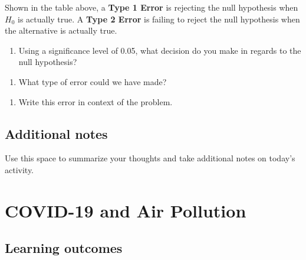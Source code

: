 \documentclass[
]{report}
\providecommand{\tightlist}{%
  \setlength{\itemsep}{0pt}\setlength{\parskip}{0pt}}
\begin{document}
Shown in the table above, a \textbf{Type 1 Error} is rejecting the null hypothesis when \(H_0\) is actually true. A \textbf{Type 2 Error} is failing to reject the null hypothesis when the alternative is actually true.

\begin{enumerate}
\def\labelenumi{\arabic{enumi}.}
\setcounter{enumi}{24}
\tightlist
\item
  Using a significance level of 0.05, what decision do you make in regards to the null hypothesis?
\end{enumerate}

\vspace{0.5in}

\begin{enumerate}
\def\labelenumi{\arabic{enumi}.}
\setcounter{enumi}{266}
\tightlist
\item
  What type of error could we have made?
\end{enumerate}

\vspace{0.5in}

\begin{enumerate}
\def\labelenumi{\arabic{enumi}.}
\setcounter{enumi}{26}
\tightlist
\item
  Write this error in context of the problem.
\end{enumerate}

\vspace{1in}

\newpage

\hypertarget{additional-notes}{%
\section{Additional notes}\label{additional-notes}}

Use this space to summarize your thoughts and take additional notes on today's activity.

\hypertarget{covid-19-and-air-pollution}{%
\chapter{COVID-19 and Air Pollution}\label{covid-19-and-air-pollution}}

\hypertarget{learning-outcomes}{%
\section{Learning outcomes}\label{learning-outcomes}}
\end{document}

